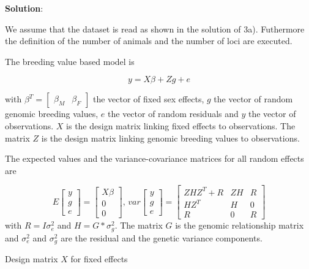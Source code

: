 \documentclass[
]{article}
\newenvironment{Shaded}{\begin{snugshade}}{\end{snugshade}}
\newcommand{\AttributeTok}[1]{\textcolor[rgb]{0.77,0.63,0.00}{#1}}
\newcommand{\CommentTok}[1]{\textcolor[rgb]{0.56,0.35,0.01}{\textit{#1}}}
\newcommand{\ConstantTok}[1]{\textcolor[rgb]{0.00,0.00,0.00}{#1}}
\newcommand{\DecValTok}[1]{\textcolor[rgb]{0.00,0.00,0.81}{#1}}
\newcommand{\FunctionTok}[1]{\textcolor[rgb]{0.00,0.00,0.00}{#1}}
\newcommand{\NormalTok}[1]{#1}
\newcommand{\OtherTok}[1]{\textcolor[rgb]{0.56,0.35,0.01}{#1}}
\newcommand{\SpecialCharTok}[1]{\textcolor[rgb]{0.00,0.00,0.00}{#1}}
\newcommand{\StringTok}[1]{\textcolor[rgb]{0.31,0.60,0.02}{#1}}
\newcommand{\solstart}
{\vspace{3ex}\textbf{Solution}:}
\begin{document}
\solstart

We assume that the dataset is read as shown in the solution of 3a).
Futhermore the definition of the number of animals and the number of
loci are executed.

The breeding value based model is

\[y = X\beta + Zg + e\]

with
\(\beta^T = \left[ \begin{array}{cc} \beta_M & \beta_F \end{array} \right]\)
the vector of fixed sex effects, \(g\) the vector of random genomic
breeding values, \(e\) the vector of random residuals and \(y\) the
vector of observations. \(X\) is the design matrix linking fixed effects
to observations. The matrix \(Z\) is the design matrix linking genomic
breeding values to observations.

The expected values and the variance-covariance matrices for all random
effects are

\[
E\left[ \begin{array}{c}y \\ g \\ e \end{array}\right] = \left[ \begin{array}{c} X\beta \\ 0 \\ 0 \end{array}\right] \text{, }
var\left[ \begin{array}{c}y \\ g \\ e \end{array}\right] = \left[ \begin{array}{ccc} ZHZ^T + R &  ZH & R  \\ HZ^T & H & 0 \\ R & 0 & R \end{array}\right]
\] with \(R = I\sigma_e^2\) and \(H = G*\sigma_g^2\). The matrix \(G\)
is the genomic relationship matrix and \(\sigma_e^2\) and \(\sigma_g^2\)
are the residual and the genetic variance components.

Design matrix \(X\) for fixed effects

\begin{Shaded}
\end{Shaded}
\end{document}

